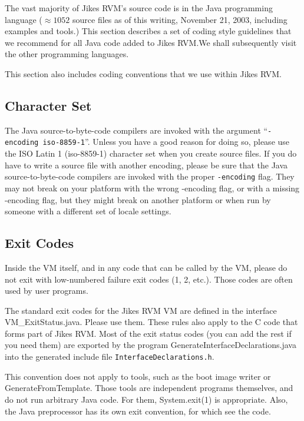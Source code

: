 The vast majority of Jikes\TMweb{} RVM's source code is in the Java\TMweb{}
programming language ($\approx 1052$ source files as of this writing,
November 21, 2003, including examples and tools.)  This section
describes a set of 
coding style guidelines that we recommend for all Java code added to
Jikes RVM.\@  We shall subsequently visit the other programming languages.

This section also includes coding conventions that we
use within Jikes RVM.\@  

\subsection{Character Set}

The Java source-to-byte-code compilers are invoked with the argument
``\texttt{-encoding iso-8859-1}''.  Unless you have a good reason
for doing so, please use the ISO Latin 1 (iso-8859-1) character set
when you create source files.  If you do have to write a source file
with another encoding, please be sure that the Java
source-to-byte-code compilers are invoked with the proper
\texttt{-encoding} flag.  They may not break on your platform with the
wrong -encoding flag, or with a missing -encoding flag, but they might
break on another platform or when run by someone with a different set of
locale settings.

\subsection{Exit Codes}

Inside the VM itself, and in any code that can be called by the VM,
please do not exit with low-numbered failure exit codes (1, 2,
etc.).  Those codes are often used by user programs.  

The standard exit codes for the Jikes RVM VM are defined in the
interface VM\_ExitStatus.java.  Please use them.  These rules also
apply to the C code that forms part of Jikes RVM.  Most of the exit
status codes (you can add the rest if you need them) are exported by
the program GenerateInterfaceDeclarations.java into the generated
include file \texttt{InterfaceDeclarations.h}.

This convention does not apply to tools, such as the boot image writer
or GenerateFromTemplate.  Those tools are independent programs
themselves, and do not run arbitrary Java code.  For them,
System.exit(1) is appropriate.  Also, the Java preprocessor has its
own exit convention, for which see the code.

